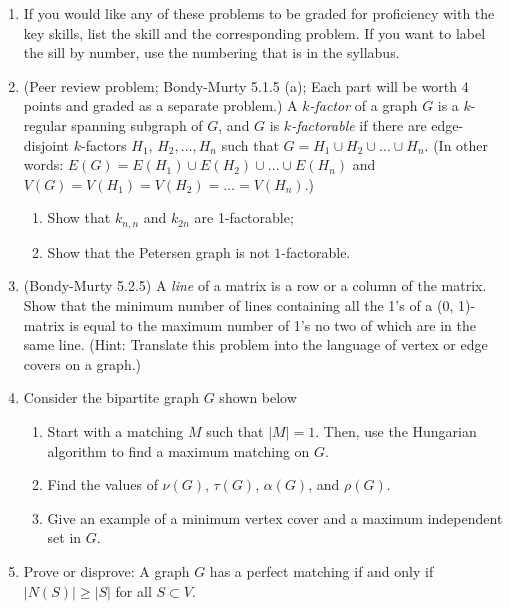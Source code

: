 \documentclass[12pt]{article}
\begin{document}
\begin{enumerate}
\item[0.] If you would like any of these problems to be graded for proficiency with the key skills, list the skill and the corresponding problem.  If you want to label the sill by number, use the numbering that is in the syllabus.
  \item (Peer review problem; Bondy-Murty 5.1.5 (a); Each part will be worth 4 points and
graded as a separate problem.) A \emph{$k$-factor} of a graph $G$ is a $k$-regular spanning subgraph of $G$, and $G$ is \emph{$k$-factorable} if there are edge-disjoint $k$-factors $H_1$, $H_2,\ldots, H_n$ such that $G=H_1\cup H_2\cup\ldots \cup H_n$.  (In other words: $E(G)=E(H_1)\cup E(H_2)\cup\ldots \cup E(H_n)$ and $V(G)=V(H_1)=V(H_2)=\ldots =V(H_n)$.)
  \begin{enumerate}
  \item Show that $k_{n,n}$ and $k_{2n}$ are 1-factorable;
  \item Show that the Petersen graph is not $1$-factorable. 
 
  \end{enumerate}
    \item (Bondy-Murty 5.2.5)   A \emph{line} of a matrix is a row or a column of  the matrix. Show that the minimum number of  lines containing all the 1's of a (0, 1)-matrix is equal to the maximum number of 1's no two of which are in the same line. (Hint: Translate this problem into the language of vertex or edge covers on a graph.)
    \item Consider the bipartite graph $G$ shown below
    \begin{center}
    \end{center}
    \begin{enumerate}
    \item Start with a matching $M$ such that $|M|=1$. Then, use the Hungarian algorithm to find a maximum matching on $G$. 
    \item Find the values of $\nu(G)$, $\tau(G)$, $\alpha(G)$, and $\rho(G)$.  
    \item Give an example of a minimum vertex cover and a maximum independent set in $G$. 
    \end{enumerate}

    \item Prove or disprove: A graph $G$ has a perfect matching if and only if $|N(S)|\ge |S|$ for all $S\subset V$. 

\end{enumerate}
\end{document}
